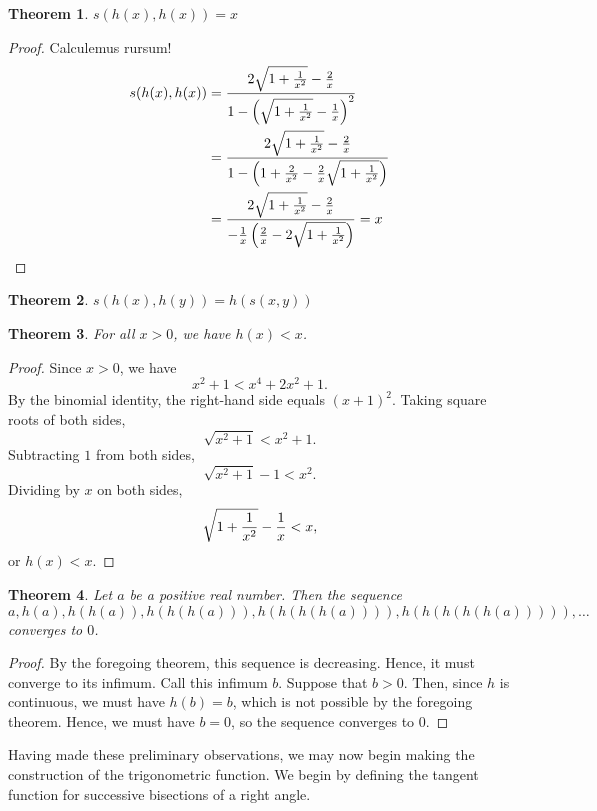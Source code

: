\documentclass[12pt]{article}
\newtheorem{thm}{Theorem}
\begin{document}
\begin{thm}
$s(h(x),h(x)) = x$
\end{thm}

\begin{proof}
Calculemus rursum!
\begin{align*}
s(h(x),h(x)) &=
{2 \sqrt{1 + {1 \over x^2}} - {2 \over x}  \over
 1 - \left( \sqrt{1 + {1 \over x^2}} - {1 \over x} \right)^2} \\ &=
{2 \sqrt{1 + {1 \over x^2}} - {2 \over x}  \over
 1 - \left( 1 + {2 \over x^2} - {2 \over x} \sqrt {1 + {1 \over x^2}} \right)} \\ &=
{2 \sqrt{1 + {1 \over x^2}} - {2 \over x}  \over
 -{1 \over x} \left( {2 \over x} - 2 \sqrt {1 + {1 \over x^2}} \right)}
= x
\end{align*}
\end{proof}

\begin{thm}
$s(h(x),h(y)) = h(s(x,y))$
\end{thm}

\begin{thm}
For all $x > 0$, we have $h(x) < x$.
\end{thm}

\begin{proof}
Since $x > 0$, we have
\[
x^2 + 1 < x^4 + 2 x^2 + 1.
\]
By the binomial identity, the right-hand side equals $(x+1)^2$.  
Taking square roots of both sides,
\[
\sqrt{x^2 + 1} < x^2 + 1.
\]
Subtracting $1$ from both sides,
\[
\sqrt{x^2 + 1} - 1 < x^2.
\]
Dividing by $x$ on both sides,
\[
\sqrt{1 + {1 \over x^2}} - {1 \over x} < x,
\]
or $h(x) < x$.
\end{proof}

\begin{thm}
Let $a$ be a positive real number.  Then the sequence
\[
a, h(a), h(h(a)), h(h(h(a))), h(h(h(h(a)))), h(h(h(h(h(a))))), \ldots
\]
converges to $0$.
\end{thm}

\begin{proof}
By the foregoing theorem, this sequence is decreasing.  Hence, it
must converge to its infimum.  Call this infimum $b$.  Suppose that
$b > 0$.  Then, since $h$ is continuous, we must have $h(b) = b$,
which is not possible by the foregoing theorem.  Hence, we must 
have $b = 0$, so the sequence converges to $0$.
\end{proof}

Having made these preliminary observations, we may now begin making
the construction of the trigonometric function.  We begin by defining
the tangent function for successive bisections of a right angle.
\end{document}
